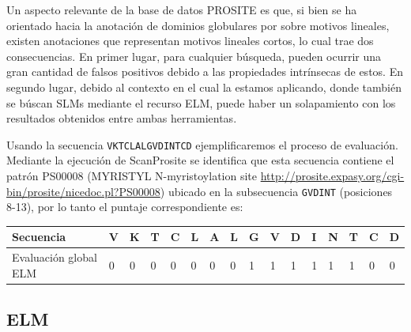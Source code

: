 Un aspecto relevante de la base de datos PROSITE es que, si bien se ha orientado hacia la anotación de dominios globulares por sobre motivos lineales, existen anotaciones que representan motivos lineales cortos, 
lo cual trae dos consecuencias. En primer lugar, para cualquier búsqueda, pueden ocurrir una gran cantidad de falsos positivos debido a las propiedades intrínsecas de estos.
En segundo lugar, debido al contexto en el cual la estamos aplicando, donde también se búscan SLMs mediante el recurso ELM, puede haber un solapamiento con los resultados obtenidos entre ambas herramientas.

Usando la secuencia \texttt{VKTCLALGVDINTCD} ejemplificaremos el proceso de evaluación.
Mediante la ejecución de ScanProsite se identifica que esta secuencia contiene el patrón PS00008 (MYRISTYL N-myristoylation site 
\url{http://prosite.expasy.org/cgi-bin/prosite/nicedoc.pl?PS00008}) ubicado en la subsecuencia \texttt{GVDINT} (posiciones 8-13), por lo tanto el puntaje correspondiente es:

\vspace{0.5cm}
\begin{tabular}{llllllllllllllll} 
\hline
Secuencia & \textbf{V} & \textbf{K} & \textbf{T} & \textbf{C} & \textbf{L} & \textbf{A} & \textbf{L} & \textbf{G} & \textbf{V} & \textbf{D} & \textbf{I} & \textbf{N} & \textbf{T} & \textbf{C} & \textbf{D}\\ \hline
Evaluación global ELM & 0 & 0 & 0 & 0 & 0 & 0 & 0 & 1 & 1 & 1 & 1 & 1 & 1 & 0 & 0 \\ \hline
\end{tabular}























\subsection{ELM}\label{elm}


